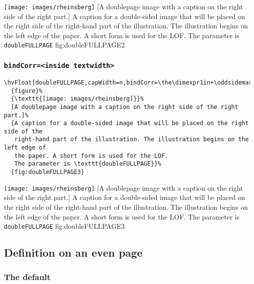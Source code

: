 \documentclass[twoside]{scrartcl}
\makeatletter
\let\hvBlindtext\Blindtext
\def\Blindtext{\par\color{black!40}\hvBlindtext\par\normalcolor}
\def\hvblindtext{\textcolor{black!40}{\blindtext@text}}
\makeatother
\begin{document}
%
  {\texttt{[image: images/rheinsberg]}}%
  [A doublepage image with a caption on the right side of the right part.]%
  {A caption for a double-sided image that will be placed on the right side of the
   right-hand part of the illustration. The illustration begins on the left edge of 
   the paper. A short form is used for the LOF. 
   The parameter is \texttt{doubleFULLPAGE}}%
  {fig:doubleFULLPAGE2}



\Blindtext

\Blindtext


\subsubsection{\texttt{bindCorr=<inside textwidth>}}

\begin{lstlisting}
\hvFloat[doubleFULLPAGE,capWidth=n,bindCorr=\the\dimexpr1in+\oddsidemargin]%
  {figure}%
  {\texttt{[image: images/rheinsberg]}}%
  [A doublepage image with a caption on the right side of the right part.]%
  {A caption for a double-sided image that will be placed on the right side of the
   right-hand part of the illustration. The illustration begins on the left edge of 
   the paper. A short form is used for the LOF. 
   The parameter is \texttt{doubleFULLPAGE}}%
  {fig:doubleFULLPAGE3}
\end{lstlisting}

%
  {\texttt{[image: images/rheinsberg]}}%
  [A doublepage image with a caption on the right side of the right part.]%
  {A caption for a double-sided image that will be placed on the right side of the
   right-hand part of the illustration. The illustration begins on the left edge of 
   the paper. A short form is used for the LOF. 
   The parameter is \texttt{doubleFULLPAGE}}%
  {fig:doubleFULLPAGE3}


\Blindtext

\subsection{Definition on an even page}
\subsubsection{The default}
\end{document}

